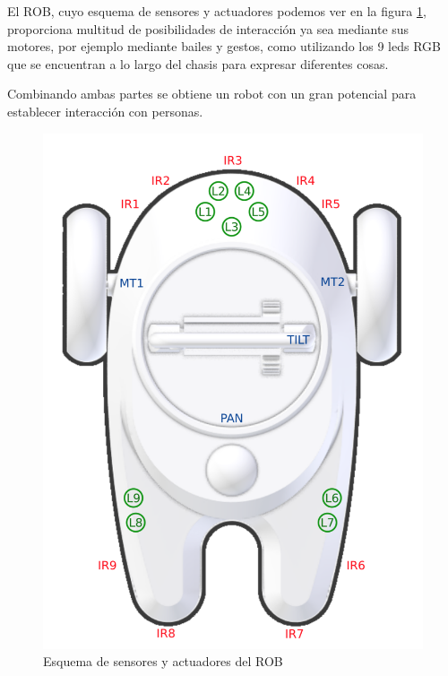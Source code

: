 El ROB, cuyo esquema de sensores y actuadores podemos ver en la figura \ref{fig:rob-schema}, proporciona multitud de posibilidades de interacción ya sea mediante sus motores, por ejemplo mediante bailes y gestos, como utilizando los 9 leds RGB que se encuentran a lo largo del chasis para expresar diferentes cosas.

Combinando ambas partes se obtiene un robot con un gran potencial para establecer interacción con personas.

\begin{figure}
	\centering
	\includegraphics[width=0.6\linewidth]{imagenes/rob_schema.png}
	\caption{Esquema de sensores y actuadores del ROB}
	\label{fig:rob-schema}
\end{figure}


